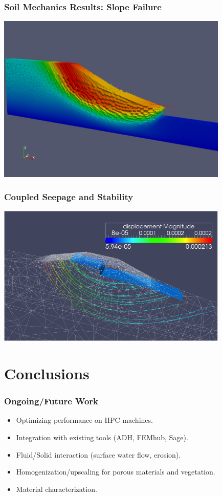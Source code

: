 \documentclass{beamer}
\begin{document}
\begin{frame}
\frametitle{Soil Mechanics Results: Slope Failure}
\includegraphics[width=4.35in]{sgfailure.png}
\end{frame}

\begin{frame}
\frametitle{Coupled Seepage and Stability}
\includegraphics[width=4.35in]{sacseepstab.png}
\end{frame}

\section{Conclusions}

\begin{frame}
  \frametitle{Ongoing/Future Work}
  \begin{itemize}
  \item Optimizing performance on HPC machines.
  \item Integration with existing tools (ADH, FEMhub, Sage).
  \item Fluid/Solid interaction (surface water flow, erosion).
  \item Homogenization/upscaling for porous materials and vegetation.
  \item Material characterization.
  \end{itemize}
\end{frame}
\end{document}
